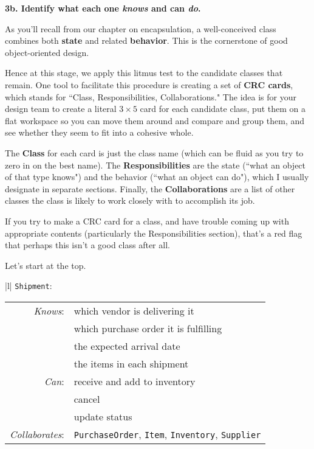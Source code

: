 \vspace{.1in}


\textbf{3b. Identify what each one \textit{knows} and can \textit{do}.}


As you'll recall from our chapter on encapsulation, a well-conceived class
combines both \textbf{state} and related \textbf{behavior}. This is the
cornerstone of good object-oriented design.

Hence at this stage, we apply this litmus test to the candidate classes that
remain. One tool to facilitate this procedure is creating a set of \textbf{CRC
cards}, which stands for ``Class, Responsibilities, Collaborations." The idea
is for your design team to create a literal $3\times5$ card for each candidate
class, put them on a flat workspace so you can move them around and compare
and group them, and see whether they seem to fit into a cohesive whole.

The \textbf{Class} for each card is just the class name (which can be fluid as
you try to zero in on the best name). The \textbf{Responsibilities} are the
state (``what an object of that type knows") and the behavior (``what an
object can do"), which I usually designate in separate sections. Finally, the
\textbf{Collaborations} are a list of other classes the class is likely to
work closely with to accomplish its job.

If you try to make a CRC card for a class, and have trouble coming up with
appropriate contents (particularly the Responsibilities section), that's a red
flag that perhaps this isn't a good class after all.

\begin{samepage}
Let's start at the top.

\begin{center}
\begin{tabular}{|l|}
\hline
\texttt{Shipment}:\\
\hline
\begin{tabular}{rl}
\textit{Knows}: & which vendor is delivering it\\
& which purchase order it is fulfilling\\
& the expected arrival date\\
& the items in each shipment \\
\textit{Can}: & receive and add to inventory\\
& cancel \\
& update status \\
\hline
\textit{Collaborates}: & \texttt{PurchaseOrder}, \texttt{Item}, \texttt{Inventory}, \texttt{Supplier}\\
\end{tabular}\\
\hline
\end{tabular}
\end{center}
\end{samepage}

